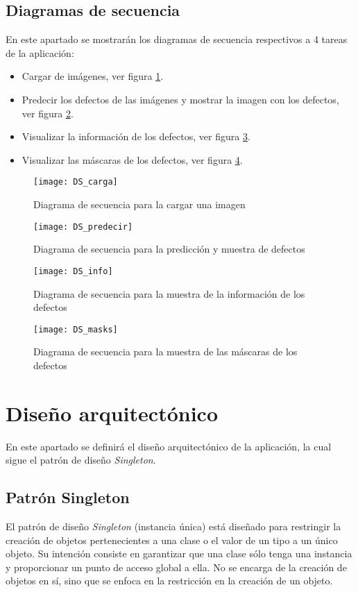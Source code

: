 \subsection{Diagramas de secuencia}

En este apartado se mostrarán los diagramas de secuencia respectivos a 4 tareas de la aplicación:

\begin{itemize}
    \item Cargar de imágenes, ver figura \ref{DS_carga}.
    \item Predecir los defectos de las imágenes y mostrar la imagen con los defectos, ver figura \ref{DS_predecir}.
    \item Visualizar la información de los defectos, ver figura \ref{DS_info}.
    \item Visualizar las máscaras de los defectos, ver figura \ref{DS_masks}.
\end{itemize}

\newpage

\begin{figure}[H]
	\centering
	\texttt{[image: DS\_carga]}
	\caption{Diagrama de secuencia para la cargar una imagen}
	\label{DS_carga}
\end{figure}

\begin{figure}[H]
	\centering
	\texttt{[image: DS\_predecir]}
	\caption{Diagrama de secuencia para la predicción y muestra de defectos}
	\label{DS_predecir}
\end{figure}

\begin{figure}[H]
	\centering
	\texttt{[image: DS\_info]}
	\caption{Diagrama de secuencia para la muestra de la información de los defectos}
	\label{DS_info}
\end{figure}

\begin{figure}[H]
	\centering
	\texttt{[image: DS\_masks]}
	\caption{Diagrama de secuencia para la muestra de las máscaras de los defectos}
	\label{DS_masks}
\end{figure}

\section{Diseño arquitectónico}

En este apartado se definirá el diseño arquitectónico de la aplicación, la cual sigue el patrón de diseño \textit{Singleton}.

\subsection{Patrón Singleton}

El patrón de diseño \textit{Singleton} \cite{singleton} (instancia única) está diseñado para restringir la creación de objetos pertenecientes a una clase o el valor de un tipo a un único objeto. Su intención consiste en garantizar que una clase sólo tenga una instancia y proporcionar un punto de acceso global a ella. No se encarga de la creación de objetos en sí, sino que se enfoca en la restricción en la creación de un objeto.